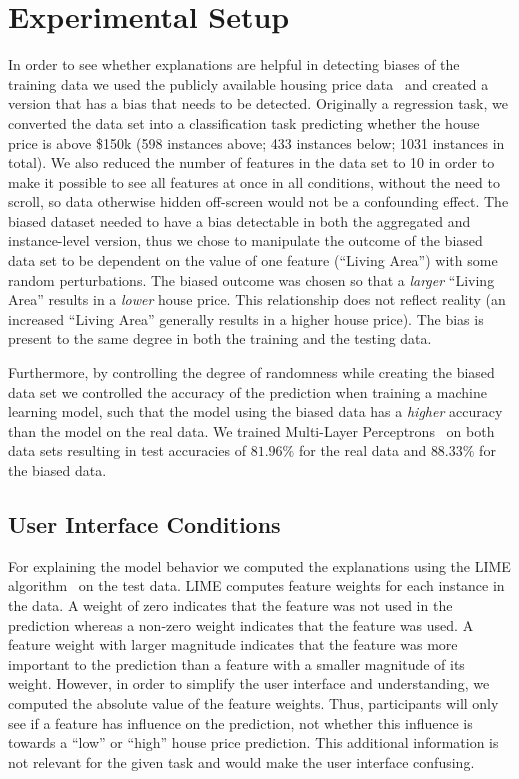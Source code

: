 \section{Experimental Setup}
\label{sec:setup}
In order to see whether explanations are helpful in detecting biases of the training data we used the publicly available housing price data~\cite{housing} and created a version that has a bias that needs to be detected.
Originally a regression task, we converted the data set into a classification task predicting whether the house price is above \$150k (598 instances above; 433 instances below; 1031 instances in total).
We also reduced the number of features in the data set to 10 in order to make it possible to see all features at once in all conditions, without the need to scroll, so data otherwise hidden off-screen would not be a confounding effect.
The biased dataset needed to have a bias detectable in both the aggregated and instance-level version, thus we chose to manipulate the outcome of the biased data set to be dependent on the value of one feature (``Living Area'') with some random perturbations.
The biased outcome was chosen so that a \emph{larger} ``Living Area'' results in a \emph{lower} house price.
This relationship does not reflect reality (an increased ``Living Area'' generally results in a higher house price).
The bias is present to the same degree in both the training and the testing data.

Furthermore, by controlling the degree of randomness while creating the biased data set we controlled the accuracy of the prediction when training a machine learning model, such that the model using the biased data has a \emph{higher} accuracy than the model on the real data.
We trained Multi-Layer Perceptrons~\cite{mlp} on both data sets resulting in test accuracies of $81.96\%$ for the real data and $88.33\%$ for the biased data.

\subsection{User Interface Conditions}
For explaining the model behavior we computed the explanations using the LIME algorithm~\cite{DBLP:journals/corr/RibeiroSG16} on the test data.
LIME computes feature weights for each instance in the data.
A weight of zero indicates that the feature was not used in the prediction whereas a non-zero weight indicates that the feature was used.
A feature weight with larger magnitude indicates that the feature was more important to the prediction than a feature with a smaller magnitude of its weight.
However, in order to simplify the user interface and understanding, we computed the absolute value of the feature weights.
Thus, participants will only see if a feature has influence on the prediction, not whether this influence is towards a ``low'' or ``high'' house price prediction.
This additional information is not relevant for the given task and would make the user interface confusing.

